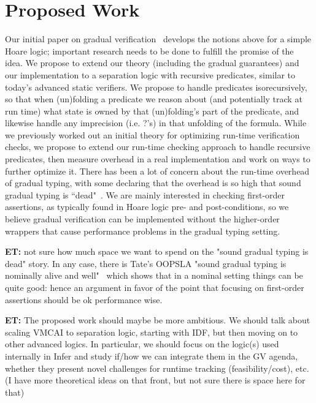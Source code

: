 \documentclass[10pt,twocolumn]{article}
\newcommand{\et}[1]{{\color{blue} {\bf ET:} #1}}
\begin{document}
\begin{sloppypar}
\section{Proposed Work}
Our initial paper on gradual verification~\cite{baderAl:vmcai2018} develops the notions above for a simple Hoare logic; important research needs to be done to fulfill the promise of the idea.
We propose to extend our theory (including the gradual guarantees) and our implementation to a separation logic with recursive predicates, similar to today's advanced static verifiers.  We propose to handle predicates isorecursively, so that when (un)folding a predicate we reason about (and potentially track at run time) what state is owned by that (un)folding's part of the predicate, and likewise handle any imprecision (i.e. ?'s) in that unfolding of the formula. While we previously worked out an initial theory for optimizing run-time verification checks, we propose to extend our run-time checking approach to handle recursive predicates, then measure overhead in a real implementation and work on ways to further optimize it.  There has been a lot of concern about the run-time overhead of gradual typing, with some declaring that the overhead is so high that sound gradual typing is ``dead"~\cite{takikawaAl:popl2016}.  We are mainly interested in checking first-order assertions, as typically found in Hoare logic pre- and post-conditions, so we believe gradual verification can be implemented without the higher-order wrappers that cause performance problems in the gradual typing setting.

\et{not sure how much space we want to spend on the "sound gradual typing is dead" story. In any case, there is Tate's OOPSLA "sound gradual typing is nominally alive and well"~\cite{muehlboeckTate:oopsla2017} which shows that in a nominal setting things can be quite good: hence an argument in favor of the point that focusing on first-order assertions should be ok performance wise.}

\et{The proposed work should maybe be more ambitious. We should talk about scaling VMCAI to separation logic, starting with IDF, but then moving on to other advanced logics. In particular, we should focus on the logic(s) used internally in Infer and study if/how we can integrate them in the GV agenda, whether they present novel challenges for runtime tracking (feasibility/cost), etc. (I have more theoretical ideas on that front, but not sure there is space here for that)}




\end{sloppypar}
\end{document}
